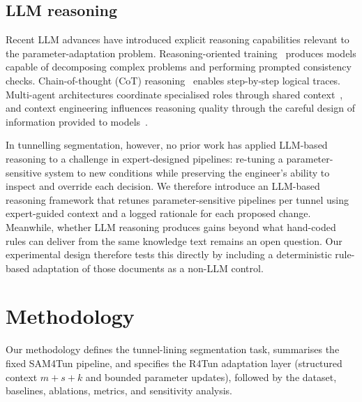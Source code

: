 \documentclass[a4paper,fleqn]{cas-dc}
\begin{document}
{\subsection{LLM reasoning}

Recent LLM advances have introduced explicit reasoning capabilities relevant to the parameter-adaptation problem. Reasoning-oriented training~\cite{ouyang2022training, deepseek2025analysis, chua2025deepseek, xiang2025metacot, openai2025o3, openai2025reasoningbestpractices} produces models capable of decomposing complex problems and performing prompted consistency checks. Chain-of-thought (CoT) reasoning~\cite{wei2023cot, kojima2023zeroshot} enables step-by-step logical traces. Multi-agent architectures coordinate specialised roles through shared context~\cite{hong2024metagpt, qian2024chatdev, chen2024comm, zhang2023igniting, zhang2024chain}, and context engineering influences reasoning quality through the careful design of information provided to models~\cite{xu2024retrieval, mei2025survey, anthropic2025context}.

In tunnelling segmentation, however, no prior work has applied LLM-based reasoning to a challenge in expert-designed pipelines: re-tuning a parameter-sensitive system to new conditions while preserving the engineer's ability to inspect and override each decision. We therefore introduce an LLM-based reasoning framework that retunes parameter-sensitive pipelines per tunnel using expert-guided context and a logged rationale for each proposed change. Meanwhile, whether LLM reasoning produces gains beyond what hand-coded rules can deliver from the same knowledge text remains an open question. Our experimental design therefore tests this directly by including a deterministic rule-based adaptation of those documents as a non-LLM control.




\section{Methodology}\label{sec:methods}

Our methodology defines the tunnel-lining segmentation task, summarises the fixed SAM4Tun pipeline, and specifies the R4Tun adaptation layer (structured context \mbox{$m+s+k$} and bounded parameter updates), followed by the dataset, baselines, ablations, metrics, and sensitivity analysis.

}
\end{document}

